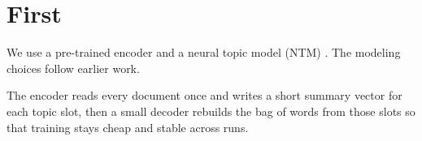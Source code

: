 \chapter{First}
We use a pre-trained encoder and a neural topic model (NTM) \citep{a}.
The modeling choices follow earlier work.

The encoder reads every document once and writes a short summary vector for each topic slot, then a small decoder rebuilds the bag of words from those slots so that training stays cheap and stable across runs.
